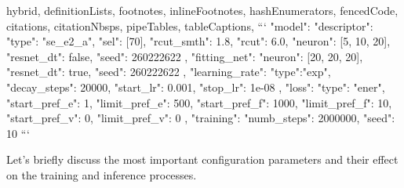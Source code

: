 \shorthandoff{-}
\begin{markdown*}{%
  hybrid,
  definitionLists,
  footnotes,
  inlineFootnotes,
  hashEnumerators,
  fencedCode,
  citations,
  citationNbsps,
  pipeTables,
  tableCaptions,
}
```
{
  "model": {
    "descriptor": {
      "type": "se_e2_a",
      "sel": [70],
      "rcut_smth": 1.8,
      "rcut": 6.0,
      "neuron": [5, 10, 20],
      "resnet_dt": false,
      "seed": 260222622
    },
    "fitting_net": {
      "neuron": [20, 20, 20],
      "resnet_dt": true,
      "seed": 260222622
    }
  },
  "learning_rate": {
    "type":"exp",
    "decay_steps": 20000,
    "start_lr": 0.001,
    "stop_lr": 1e-08
  },
  "loss": {
    "type": "ener",
    "start_pref_e": 1,
    "limit_pref_e": 500,
    "start_pref_f": 1000,
    "limit_pref_f": 10,
    "start_pref_v": 0,
    "limit_pref_v": 0
  },
  "training": {
    "numb_steps": 2000000,
    "seed": 10
  }
}
```
\end{markdown*}
\shorthandon{-}
\noindent Let's briefly discuss the most important configuration parameters
and their effect on the training and inference processes.

